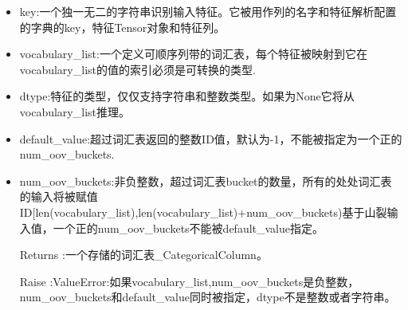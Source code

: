 \begin{itemize}
	\item key:一个独一无二的字符串识别输入特征。它被用作列的名字和特征解析配置的字典的key，特征Tensor对象和特征列。
	\item vocabulary\_list:一个定义可顺序列带的词汇表，每个特征被映射到它在vocabulary\_list的值的索引必须是可转换的类型.
	\item dtype:特征的类型，仅仅支持字符串和整数类型。如果为None它将从vocabulary\_list推理。
	\item default\_value:超过词汇表返回的整数ID值，默认为-1，不能被指定为一个正的num\_oov\_buckets.
	\item num\_oov\_buckets:非负整数，超过词汇表bucket的数量，所有的处处词汇表的输入将被赋值ID[len(vocabulary\_list),len(vocabulary\_list)+num\_oov\_buckets)基于山裂输入值，一个正的num\_oov\_buckets不能被default\_value指定。
	\item[Returns]:一个存储的词汇表\_CategoricalColumn。
	\item[Raise]:ValueError:如果vocabulary\_list,num\_oov\_buckets是负整数，num\_oov\_buckets和default\_value同时被指定，dtype不是整数或者字符串。
\end{itemize}
